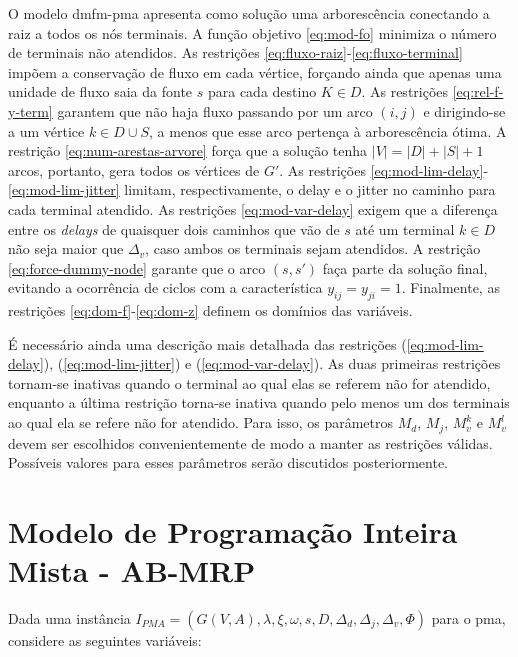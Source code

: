 O  modelo  \gls{dmfm-pma}  apresenta como  solução  uma  arborescência
conectando  a  raiz a  todos  os  nós  terminais.  A  função  objetivo
\eqref{eq:mod-fo} minimiza  o número  de terminais não  atendidos.  As
restrições  \eqref{eq:fluxo-raiz}-\eqref{eq:fluxo-terminal}  impõem  a
conservação de  fluxo em cada  vértice, forçando ainda que  apenas uma
unidade de fluxo  saia da fonte $s$  para cada destino $K  \in D$.  As
restrições  \eqref{eq:rel-f-y-term}   garantem  que  não   haja  fluxo
passando por  um arco $(i,  j)$ e dirigindo-se a  um vértice $k  \in D
\cup S$,  a menos  que esse  arco pertença  à arborescência  ótima.  A
restrição \eqref{eq:num-arestas-arvore} força que a solução tenha $|V|
= |D| + |S| + 1$ arcos,  portanto, gera todos os vértices de $G'$.  As
restrições \eqref{eq:mod-lim-delay}-\eqref{eq:mod-lim-jitter} limitam,
respectivamente,  o delay  e o  jitter no  caminho para  cada terminal
atendido.   As   restrições  \eqref{eq:mod-var-delay}  exigem   que  a
diferença entre os \textit{delays} de  quaisquer dois caminhos que vão
de $s$ até um  terminal $k \in D$ não seja  maior que $\Delta_v$, caso
ambos     os    terminais     sejam     atendidos.     A     restrição
\eqref{eq:force-dummy-node} garante que o arco $(s, s')$ faça parte da
solução final,  evitando a ocorrência  de ciclos com  a característica
$y_{ij}    =    y_{ji}    =    1$.     Finalmente,    as    restrições
\eqref{eq:dom-f}-\eqref{eq:dom-z} definem os domínios das variáveis.

É  necessário  ainda  uma  descrição  mais  detalhada  das  restrições
(\ref{eq:mod-lim-delay}),          (\ref{eq:mod-lim-jitter})         e
(\ref{eq:mod-var-delay}).   As  duas  primeiras  restrições  tornam-se
inativas quando o  terminal ao qual elas se referem  não for atendido,
enquanto a última restrição torna-se  inativa quando pelo menos um dos
terminais  ao qual  ela se  refere não  for atendido.   Para isso,  os
parâmetros  $M_d$,  $M_j$,  $M_v^k$  e $M_v^l$  devem  ser  escolhidos
convenientemente de  modo a  manter as restrições  válidas.  Possíveis
valores para esses parâmetros serão discutidos posteriormente.

\section{Modelo de Programação Inteira Mista - AB-MRP} \label{sec:ab-pma}

Dada uma  instância $I_{PMA} = (G(V,  A), \lambda, \xi, \omega,  s, D,
\Delta_{d}, \Delta_{j}, \Delta_{v}, \Phi)$ para o \gls{pma}, considere
as seguintes variáveis:

